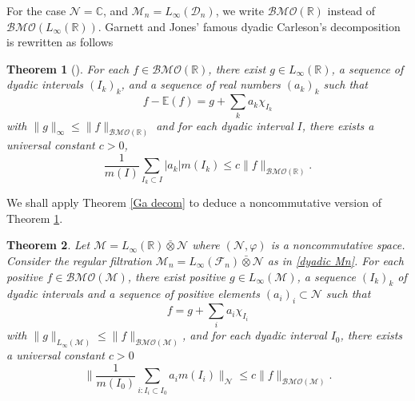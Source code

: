 \documentclass[11]{amsart}
\numberwithin{equation}{section}
\newtheorem{theorem}{Theorem}[section]
\begin{document}
For the case $\mathcal{N}=\mathbb{C}$, and $\mathcal{M}_n=L_{\infty}(\mathcal{D}_n)$, we write $\mathcal{BMO}(\mathbb{R})$ instead of $ \mathcal{BMO}(L_{\infty}(\mathbb{R}))$.  Garnett and Jones' famous dyadic Carleson's decomposition is rewritten as follows
\begin{theorem}[{\cite[Theorem 2.1]{GJ1982}}]\label{GJ thm}
	For each $f\in \mathcal{BMO}(\mathbb{R})$, there exist $g\in L_{\infty}(\mathbb{R})$,  a sequence of dyadic intervals $(I_k)_k$,  and a sequence of real numbers $(a_k)_{k}$ such that
	$$f-\mathbb{E}(f)=g+\sum_ka_k\chi_{I_k}$$
	with $\|g\|_{\infty}\leq \|f\|_{\mathcal{BMO}(\mathbb{R})}$
	and for each dyadic interval $I$, there exists a universal constant $c>0$,
	$$\frac{1}{m(I)}\sum_{I_k\subset I}|a_k| m(I_k)\leq c\|f\|_{\mathcal{BMO}(\mathbb{R})}.$$
\end{theorem}




We shall apply Theorem \ref{Ga decom} to deduce a noncommutative version of Theorem \ref{GJ thm}. 

\begin{theorem}\label{dyadic c-d}
	Let $\mathcal{M}=L_{\infty}(\mathbb{R})\bar{\otimes}\mathcal{N}$ where $(\mathcal{N},\varphi)$ is a noncommutative space. Consider the regular filtration $\mathcal{M}_n=L_{\infty}(\mathcal{F}_n)\bar{\otimes}\mathcal{N}$ as in \eqref{dyadic Mn}.  For each positive $f\in \mathcal{BMO}(\mathcal{M})$, there exist positive $g\in L_{\infty}(\mathcal{M})$,  a sequence $(I_k)_k$ of dyadic intervals and a sequence of positive elements $(a_i)_{i}\subset \mathcal{N}$ such that
	$$f=g+\sum_ia_i\chi_{I_i}$$
	with $\|g\|_{L_{\infty}(\mathcal{M})}\leq \|f\|_{\mathcal{BMO}(\mathcal{M})}$,
	and for each dyadic interval $I_0$, there exists a universal constant $c>0$
	$$\Big\|\frac{1}{m(I_0)}\sum_{i:I_i\subset I_0}a_i m(I_i)\Big\|_{\mathcal{N}}\leq c\|f\|_{\mathcal{BMO}(\mathcal{M})}.$$
\end{theorem}
\end{document}
